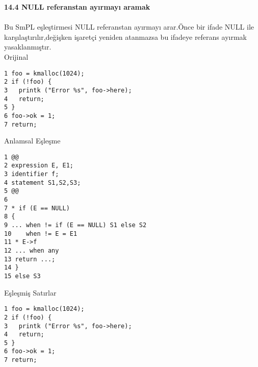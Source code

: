 \documentclass[22pt]{article}
\begin{document}
\textbf{14.4 NULL referanstan ayırmayı aramak}\\
\\
Bu SmPL eşleştirmesi NULL referanstan ayırmayı arar.Önce bir ifade NULL ile karşılaştırılır,değişken işaretçi yeniden atanmazsa bu ifadeye referans ayırmak yasaklanmıştır.
\\		
		  Orijinal\\
\begin{lstlisting}
1 foo = kmalloc(1024);
2 if (!foo) {
3   printk ("Error %s", foo->here);
4   return;
5 }
6 foo->ok = 1;
7 return;
\end{lstlisting}
		Anlamsal Eşleşme\\
\begin{lstlisting}
1 @@
2 expression E, E1;
3 identifier f;
4 statement S1,S2,S3;
5 @@
6
7 * if (E == NULL)
8 {
9 ... when != if (E == NULL) S1 else S2
10    when != E = E1
11 * E->f
12 ... when any
13 return ...;
14 }
15 else S3
\end{lstlisting}
	      Eşleşmiş Satırlar\\
\begin{lstlisting}
1 foo = kmalloc(1024);
2 if (!foo) {
3   printk ("Error %s", foo->here);
4   return;
5 }
6 foo->ok = 1;
7 return;
\end{lstlisting}
\end{document}
